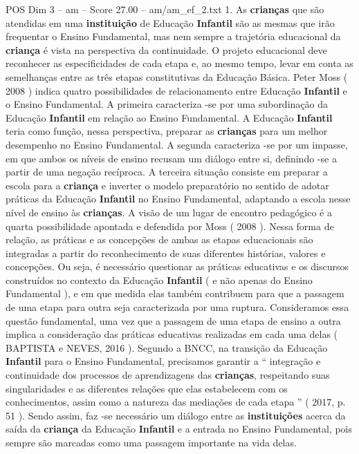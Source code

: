 \begin{textsample}{POS Dim 3 – am – Score 27.00 – am/am\_ef\_2.txt}  \label{ex:f3_pos_038}
1.
As \textbf{crianças} que são atendidas em uma \textbf{instituição} de Educação \textbf{Infantil} são as mesmas que irão frequentar o Ensino Fundamental, mas nem sempre a trajetória educacional da \textbf{criança} é vista na perspectiva da continuidade.
O projeto educacional deve reconhecer as especificidades de cada etapa e, ao mesmo tempo, levar em conta as semelhanças entre as três etapas constitutivas da Educação Básica.
Peter Moss ( 2008 ) indica quatro possibilidades de relacionamento entre Educação \textbf{Infantil} e o Ensino Fundamental.
A primeira caracteriza -se por uma subordinação da Educação \textbf{Infantil} em relação ao Ensino Fundamental.
A Educação \textbf{Infantil} teria como função, nessa perspectiva, preparar as \textbf{crianças} para um melhor desempenho no Ensino Fundamental.
A segunda caracteriza -se por um impasse, em que ambos os níveis de ensino recusam um diálogo entre si, definindo -se a partir de uma negação recíproca.
A terceira situação consiste em preparar a escola para a \textbf{criança} e inverter o modelo preparatório no sentido de adotar práticas da Educação \textbf{Infantil} no Ensino Fundamental, adaptando a escola nesse nível de ensino às \textbf{crianças}.
A visão de um lugar de encontro pedagógico é a quarta possibilidade apontada e defendida por Moss ( 2008 ).
Nessa forma de relação, as práticas e as concepções de ambas as etapas educacionais são integradas a partir do reconhecimento de suas diferentes histórias, valores e concepções.
Ou seja, é necessário questionar as práticas educativas e os discursos construídos no contexto da Educação \textbf{Infantil} ( e não apenas do Ensino Fundamental ), e em que medida elas também contribuem para que a passagem de uma etapa para outra seja caracterizada por uma ruptura.
Consideramos essa questão fundamental, uma vez que a passagem de uma etapa de ensino a outra implica a consideração das práticas educativas realizadas em cada uma delas ( BAPTISTA e NEVES, 2016 ).
Segundo a BNCC, na transição da Educação \textbf{Infantil} para o Ensino Fundamental, precisamos garantir a “ integração e continuidade dos processos de aprendizagens das \textbf{crianças}, respeitando suas singularidades e as diferentes relações que elas estabelecem com os conhecimentos, assim como a natureza das mediações de cada etapa ” ( 2017, p. 51 ).
Sendo assim, faz -se necessário um diálogo entre as \textbf{instituições} acerca da saída da \textbf{criança} da Educação \textbf{Infantil} e a entrada no Ensino Fundamental, pois sempre são marcadas como uma passagem importante na vida delas.

\end{textsample}

